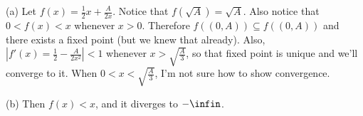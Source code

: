 \begin{description}
\item{(a)} Let $f(x) = \frac{1}{2}x + \frac{A}{2x}$.  Notice that
$f(\sqrt{A}) = \sqrt{A}$.  Also notice that $0 < f(x) < x$ whenever $x >
0$.  Therefore $f((0,A)) \subseteq f((0,A))$ and there exists a fixed
point (but we knew that already).  Also, $|f'(x) = \frac{1}{2} -
\frac{A}{2x^2}| < 1$ whenever $x > \sqrt{\frac{A}{3}}$, so that fixed
point is unique and we'll converge to it.  When $0 < x <
\sqrt{\frac{A}{3}}$, I'm not sure how to show convergence.
\item{(b)} Then $f(x) < x$, and it diverges to $-\infin$.
\end{description}

